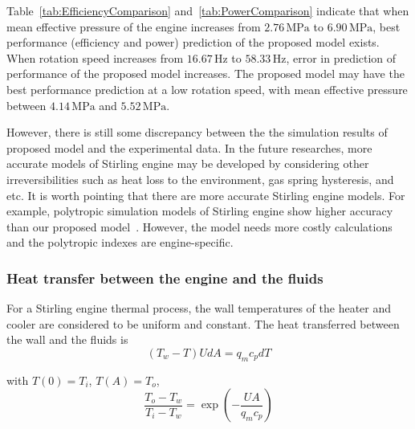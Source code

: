 Table~\ref{tab:EfficiencyComparison} and~\ref{tab:PowerComparison} indicate that when mean effective pressure of the engine increases from $2.76\,\mathrm{MPa}$ to $6.90\,\mathrm{MPa}$, best performance (efficiency and power) prediction of the proposed model exists. When rotation speed increases from $16.67\,\mathrm{Hz}$ to $58.33\,\mathrm{Hz}$, error in prediction of performance of the proposed model increases. The proposed model may have the best performance prediction at a low rotation speed, with mean effective pressure between $4.14\,\mathrm{MPa}$ and $5.52\,\mathrm{MPa}$.

However, there is still some discrepancy between the the simulation results of proposed model and the experimental data. In the future researches, more accurate models of Stirling engine may be developed by considering other irreversibilities such as heat loss to the environment, gas spring hysteresis, and etc. It is worth pointing that there are more accurate Stirling engine models. For example, polytropic simulation models of Stirling engine show higher accuracy than our proposed model~\cite{Hosseinzade2015, Babaelahi2015}. However, the model needs more costly calculations and the polytropic indexes are engine-specific.

\subsubsection{Heat transfer between the engine and the fluids}

For a Stirling engine thermal process, the wall temperatures of the heater and cooler are considered to be uniform and constant. The heat transferred between the wall and the fluids is
\begin{equation}
	(T_w-T)UdA = q_mc_pdT
\end{equation}

with $T(0)=T_i$, $T(A)=T_o$,
\begin{equation}
	\frac{T_o-T_w}{T_i-T_w}=\exp(-\frac{UA}{q_mc_p})
\end{equation}

